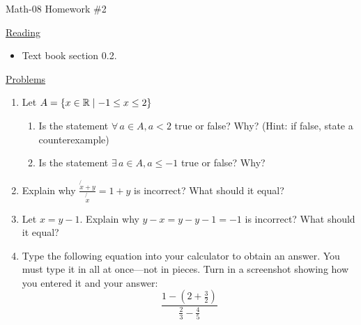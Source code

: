 \documentclass[letterpaper,12pt,fleqn]{article}
\begin{document}
\begin{center}
\Large Math-08 Homework \#2
\end{center}

\vspace{0.5in}

\underline{Reading}

\begin{itemize}
\item Text book section 0.2.
\end{itemize}

\underline{Problems}

\begin{enumerate}
\item Let $A=\{x\in\mathbb{R}\mid-1\le x\le2\}$
  \begin{enumerate}
  \item Is the statement $\forall\,a\in A,a<2$ true or false? Why? (Hint: if
    false, state a counterexample)

  \item Is the statement $\exists\,a\in A,a\le-1$ true or false? Why?
    \end{enumerate}

\item Explain why $\frac{\not{x}+y}{\not{x}}=1+y$ is incorrect? What should it
  equal?

\item Let $x=y-1$. Explain why $y-x=y-y-1=-1$ is incorrect? What should it
  equal?

\item Type the following equation into your calculator to obtain an answer.
  You must type it in all at once---not in pieces. Turn in a screenshot
  showing how you entered it and your answer:
  \[\frac{1-(2+\frac{3}{2})}{\frac{2}{3}-\frac{4}{5}}\]
\end{enumerate}
\end{document}
